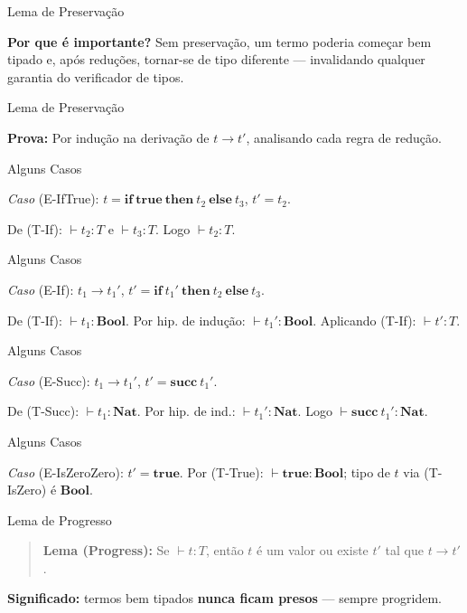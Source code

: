 \begin{frame}{Lema de Preservação}

    \textbf{Por que é importante?} Sem preservação, um termo poderia começar
    bem tipado e, após reduções, tornar-se de tipo diferente --- invalidando
    qualquer garantia do verificador de tipos.
\end{frame}

\begin{frame}{Lema de Preservação}

    \textbf{Prova:} Por indução na derivação de \(t \to t'\), analisando
    cada regra de redução.
\end{frame}

\begin{frame}{Alguns Casos}

    \emph{Caso} (E-IfTrue):
    \(t = \mathbf{if}\ \mathbf{true}\ \mathbf{then}\ t_2\ \mathbf{else}\ t_3\),
    \(t' = t_2\).

    De (T-If): \(\vdash t_2 : T\) e \(\vdash t_3 : T\). Logo
    \(\vdash t_2 : T\). \checkmark{}
\end{frame}

\begin{frame}{Alguns Casos}

    \emph{Caso} (E-If): \(t_1 \to t_1'\),
    \(t' = \mathbf{if}\ t_1'\ \mathbf{then}\ t_2\ \mathbf{else}\ t_3\).

    De (T-If): \(\vdash t_1 : \mathbf{Bool}\). Por hip. de indução:
    \(\vdash t_1' : \mathbf{Bool}\). Aplicando (T-If): \(\vdash t' : T\). \checkmark{}
\end{frame}

\begin{frame}{Alguns Casos}

    \emph{Caso} (E-Succ): \(t_1 \to t_1'\), \(t' = \mathbf{succ}\ t_1'\).

    De (T-Succ): \(\vdash t_1 : \mathbf{Nat}\). Por hip. de ind.:
    \(\vdash t_1' : \mathbf{Nat}\). Logo
    \(\vdash \mathbf{succ}\ t_1' : \mathbf{Nat}\). \checkmark{}
\end{frame}

\begin{frame}{Alguns Casos}

    \emph{Caso} (E-IsZeroZero): \(t' = \mathbf{true}\). Por (T-True):
    \(\vdash \mathbf{true} : \mathbf{Bool}\); tipo de \(t\) via (T-IsZero) é
    \(\mathbf{Bool}\). \checkmark{}
\end{frame}

\begin{frame}{Lema de Progresso}

    \begin{quote}
        \textbf{Lema (Progress):} Se \(\vdash t : T\), então \(t\) é um valor ou
        existe \(t'\) tal que \(t \to t'\).
    \end{quote}

    \textbf{Significado:} termos bem tipados \textbf{nunca ficam presos} ---
    sempre progridem.
\end{frame}

